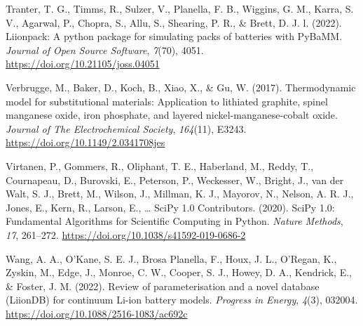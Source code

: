 \documentclass[
]{article}
\newlength{\cslhangindent}
\newenvironment{CSLReferences}[2] %
 {\begin{list}{}{%
  \setlength{\itemindent}{0pt}
  \setlength{\leftmargin}{0pt}
  \setlength{\parsep}{0pt}
  \ifodd #1
   \setlength{\leftmargin}{\cslhangindent}
   \setlength{\itemindent}{-1\cslhangindent}
  \fi
  \setlength{\itemsep}{#2\baselineskip}}}
 {\end{list}}
\begin{document}
\begin{CSLReferences}{1}{0}
Tranter, T. G., Timms, R., Sulzer, V., Planella, F. B., Wiggins, G. M.,
Karra, S. V., Agarwal, P., Chopra, S., Allu, S., Shearing, P. R., \&
Brett, D. J. l. (2022). Liionpack: A python package for simulating packs
of batteries with PyBaMM. \emph{Journal of Open Source Software},
\emph{7}(70), 4051. \url{https://doi.org/10.21105/joss.04051}

Verbrugge, M., Baker, D., Koch, B., Xiao, X., \& Gu, W. (2017).
Thermodynamic model for substitutional materials: Application to
lithiated graphite, spinel manganese oxide, iron phosphate, and layered
nickel-manganese-cobalt oxide. \emph{Journal of The Electrochemical
Society}, \emph{164}(11), E3243.
\url{https://doi.org/10.1149/2.0341708jes}

Virtanen, P., Gommers, R., Oliphant, T. E., Haberland, M., Reddy, T.,
Cournapeau, D., Burovski, E., Peterson, P., Weckesser, W., Bright, J.,
van der Walt, S. J., Brett, M., Wilson, J., Millman, K. J., Mayorov, N.,
Nelson, A. R. J., Jones, E., Kern, R., Larson, E., \ldots{} SciPy 1.0
Contributors. (2020). {{SciPy} 1.0: Fundamental Algorithms for
Scientific Computing in Python}. \emph{Nature Methods}, \emph{17},
261--272. \url{https://doi.org/10.1038/s41592-019-0686-2}

Wang, A. A., O'Kane, S. E. J., Brosa Planella, F., Houx, J. L., O'Regan,
K., Zyskin, M., Edge, J., Monroe, C. W., Cooper, S. J., Howey, D. A.,
Kendrick, E., \& Foster, J. M. (2022). Review of parameterisation and a
novel database {(LiionDB)} for continuum {Li-ion} battery models.
\emph{Progress in Energy}, \emph{4}(3), 032004.
\url{https://doi.org/10.1088/2516-1083/ac692c}

\end{CSLReferences}
\end{document}
